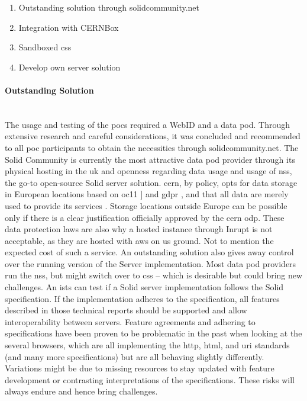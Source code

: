 \begin{enumerate}
    \item Outstanding solution through solidcommunity.net
    \item Integration with CERNBox
    \item Sandboxed \gls{css}
    \item Develop own server solution
\end{enumerate}

\paragraph{Outstanding Solution}\mbox{}\\

The usage and testing of the \glspl{poc} required a WebID and a data pod. Through extensive research and careful considerations, it was concluded and recommended to all \gls{poc} participants to obtain the necessities through solidcommunity.net. The Solid Community is currently the most attractive data pod provider through its physical hosting in the \gls{uk} and openness regarding data usage and usage of \gls{nss}, the go-to open-source Solid server solution. \gls{cern}, by policy, opts for data storage in European locations based on \gls{oc11} \cite{oc11}] and \gls{gdpr} \cite{gdpr}, and that all data are merely used to provide its services \cite{policy-cern-server}. Storage locations outside Europe can be possible only if there is a clear justification officially approved by the \gls{cern} \gls{odp}. These data protection laws are also why a hosted instance through Inrupt \cite{inrupt} is not acceptable, as they are hosted with \gls{aws} on \gls{us} ground. Not to mention the expected cost of such a service. An outstanding solution also gives away control over the running version of the Server implementation. Most data pod providers run the \gls{nss}, but might switch over to \gls{css} -- which is desirable but could bring new challenges.
An \gls{ists} \cite{solid-test-suite} can test if a Solid server implementation follows the Solid specification. If the implementation adheres to the specification, all features described in those technical reports should be supported and allow interoperability between servers. Feature agreements and adhering to specifications have been proven to be problematic in the past when looking at the several browsers, which are all implementing the \gls{http}, \gls{html}, and \gls{uri} standards (and many more specifications) but are all behaving slightly differently. Variations might be due to missing resources to stay updated with feature development or contrasting interpretations of the specifications. These risks will always endure and hence bring challenges.
\vspace{0.5cm}
